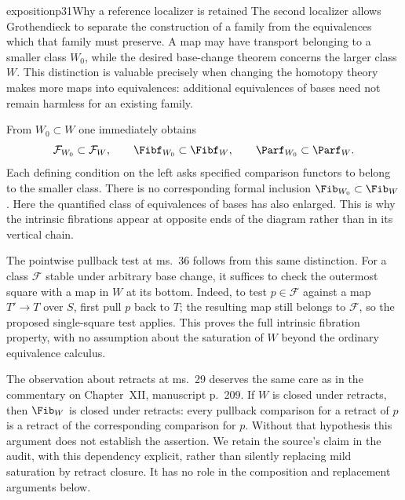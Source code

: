 \begin{dcomment}{exposition}{p31}{Why a reference localizer is retained}
The second localizer allows Grothendieck to separate the construction of a family from the equivalences which that family must preserve. A map may have transport belonging to a smaller class $W_0$, while the desired base-change theorem concerns the larger class $W$. This distinction is valuable precisely when changing the homotopy theory makes more maps into equivalences: additional equivalences of bases need not remain harmless for an existing family.

From $W_0\subset W$ one immediately obtains
\[
 \mathcal F_{W_0}\subset\mathcal F_W,\qquad
 \Fibf_{W_0}\subset\Fibf_W,\qquad
 \Parf_{W_0}\subset\Parf_W.
\]
Each defining condition on the left asks specified comparison functors to belong to the smaller class. There is no corresponding formal inclusion $\Fib_{W_0}\subset\Fib_W$. Here the quantified class of equivalences of bases has also enlarged. This is why the intrinsic fibrations appear at opposite ends of the diagram rather than in its vertical chain.

The pointwise pullback test at ms.~36 follows from this same distinction. For a class $\mathcal F$ stable under arbitrary base change, it suffices to check the outermost square with a map in $W$ at its bottom. Indeed, to test $p\in\mathcal F$ against a map $T'\to T$ over $S$, first pull $p$ back to $T$; the resulting map still belongs to $\mathcal F$, so the proposed single-square test applies. This proves the full intrinsic fibration property, with no assumption about the saturation of $W$ beyond the ordinary equivalence calculus.

The observation about retracts at ms.~29 deserves the same care as in the commentary on Chapter~XII, manuscript p.~209. If $W$ is closed under retracts, then $\Fib_W$ is closed under retracts: every pullback comparison for a retract of $p$ is a retract of the corresponding comparison for $p$. Without that hypothesis this argument does not establish the assertion. We retain the source's claim in the audit, with this dependency explicit, rather than silently replacing mild saturation by retract closure. It has no role in the composition and replacement arguments below.
\end{dcomment}

